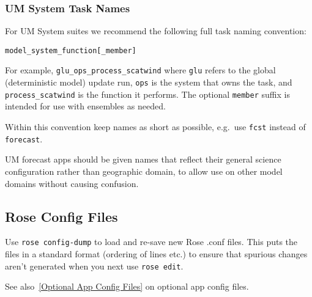 \subsubsection{UM System Task Names}

For UM System suites we recommend the following full task naming convention:

\lstset{language=suiterc}
\begin{lstlisting}
model_system_function[_member]
\end{lstlisting}

For example, \lstinline=glu_ops_process_scatwind= where \lstinline=glu= refers
to the global (deterministic model) update run, \lstinline=ops= is the system
that owns the task, and \lstinline=process_scatwind= is the function it
performs. The optional \lstinline=member= suffix is intended for use with
ensembles as needed.

Within this convention keep names as short as possible, e.g.\ use
\lstinline=fcst= instead of \lstinline=forecast=.

UM forecast apps should be given names that reflect their general science
configuration rather than geographic domain, to allow use on other model
domains without causing confusion.

\subsection{Rose Config Files}

Use \lstinline=rose config-dump= to load and re-save new Rose .conf files. This
puts the files in a standard format (ordering of lines etc.) to ensure that
spurious changes aren't generated when you next use \lstinline=rose edit=.

See also~\ref{Optional App Config Files} on optional app config files.
